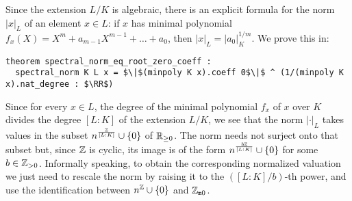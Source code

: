 \documentclass[sigplan,screen]{acmart}
\begin{document}
Since the extension $L/K$ is algebraic, there is an explicit formula for the norm $\lvert x\rvert_L$ of an element $x \in L$: if $x$ has minimal polynomial $f_x(X) = X^m + a_{m-1}X^{m-1} + \dots + a_0$, then $\lvert x\rvert _L = \lvert a_0\rvert _K^{1/m}$. We prove this in\href{https://github.com/mariainesdff/local_fields_journal/blob/7ac213eb804fe7945468023527a0fe26ab23b3c8/src/spectral_norm.lean#L171}{\extlink}:

\begin{lstlisting}
theorem spectral_norm_eq_root_zero_coeff :
  spectral_norm K L x = $\|$(minpoly K x).coeff 0$\|$ ^ (1/(minpoly K x).nat_degree : $\RR$)
\end{lstlisting}

Since for every $x \in L$, the degree of the minimal polynomial $f_x$ of $x$ over $K$ divides the degree $[L : K]$ of the extension $L/K$\href{https://github.com/mariainesdff/local_fields_journal/blob/7ac213eb804fe7945468023527a0fe26ab23b3c8/src/for_mathlib/field_theory/minpoly/is_integrally_closed.lean#L31}{\extlink}, we see that the norm $\lvert\cdot\rvert_L$ takes values in the subset $n^{\frac{\mathbb{Z}}{[L : K]}} \cup \{0\}$ of $\mathbb{R}_{\ge 0}$. The norm needs not surject onto that subset but, since $\mathbb{Z}$ is cyclic, its image is of the form $n^{\frac{b\mathbb{Z}}{[L : K]}} \cup \{0\}$ for some $b \in \mathbb{Z}_{>0}$. Informally speaking, to obtain the corresponding normalized valuation we just need to rescale the norm by raising it to the $([L:K]/b)$-th power, and use the identification between $n^{\mathbb{Z}} \cup \{0\}$ and $\mathbb{Z}_{\mathtt{m}0}$.
\end{document}
